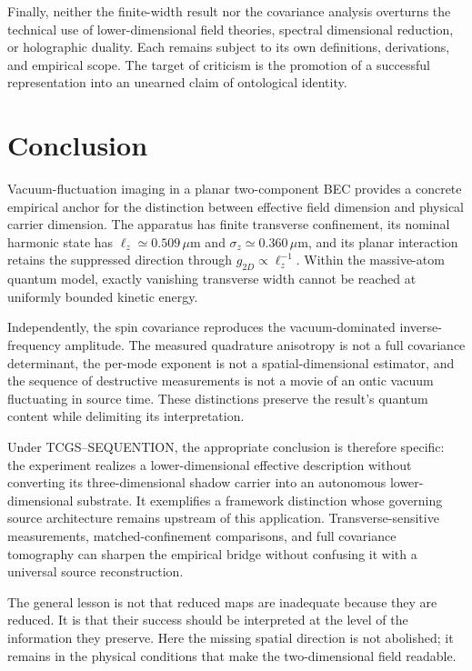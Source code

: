 \documentclass[11pt,a4paper]{article}
\theoremstyle{definition}
\theoremstyle{remark}
\newcommand{\TCGS}{TCGS--SEQUENTION}
\newcommand{\lop}{\ell_z}
\begin{document}
Finally, neither the finite-width result nor the covariance analysis overturns the technical use of lower-dimensional field theories, spectral dimensional reduction, or holographic duality. Each remains subject to its own definitions, derivations, and empirical scope. The target of criticism is the promotion of a successful representation into an unearned claim of ontological identity.\cite{carlip,bousso,foundation}

\section{Conclusion}
\label{sec:conclusion}
Vacuum-fluctuation imaging in a planar two-component BEC provides a concrete empirical anchor for the distinction between effective field dimension and physical carrier dimension. The apparatus has finite transverse confinement, its nominal harmonic state has $\lop\simeq0.509\,\mu\mathrm m$ and $\sigma_z\simeq0.360\,\mu\mathrm m$, and its planar interaction retains the suppressed direction through $g_{2D}\propto\lop^{-1}$. Within the massive-atom quantum model, exactly vanishing transverse width cannot be reached at uniformly bounded kinetic energy.\cite{zhang2026}

Independently, the spin covariance reproduces the vacuum-dominated inverse-frequency amplitude. The measured quadrature anisotropy is not a full covariance determinant, the per-mode exponent is not a spatial-dimensional estimator, and the sequence of destructive measurements is not a movie of an ontic vacuum fluctuating in source time. These distinctions preserve the result's quantum content while delimiting its interpretation.\cite{zhang2026}

Under \TCGS, the appropriate conclusion is therefore specific: the experiment realizes a lower-dimensional effective description without converting its three-dimensional shadow carrier into an autonomous lower-dimensional substrate. It exemplifies a framework distinction whose governing source architecture remains upstream of this application. Transverse-sensitive measurements, matched-confinement comparisons, and full covariance tomography can sharpen the empirical bridge without confusing it with a universal source reconstruction.\cite{foundation,logical}

The general lesson is not that reduced maps are inadequate because they are reduced. It is that their success should be interpreted at the level of the information they preserve. Here the missing spatial direction is not abolished; it remains in the physical conditions that make the two-dimensional field readable.
\end{document}
